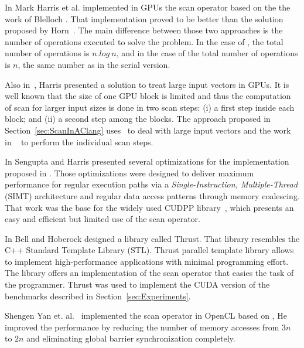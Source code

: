 \documentclass[Ingles]{ic-tese-v1}
\newcommand{\rsec}[1]{Section~\ref{sec:#1}}
\begin{document}
In \cite{harris2007parallel} Mark Harris  et al.  implemented in GPUs the scan
operator     based     on     the     the     work     of     Blelloch
\cite{ScanAsPrimitive}. That  implementation proved to be  better than
the solution  proposed by  Horn~\cite{GPUGems2}.  The  main difference
between those two  approaches is the number of  operations executed to
solve the problem. In the case of \cite{GPUGems2}, the total number of
operations is $n.log\ n$, and in the case of \cite{harris2007parallel}
the  total number  of operations  is $n$,  the same  number as  in the
serial version.  

Also  in~\cite{harris2007parallel},  Harris  presented a  solution  to
treat large input vectors in GPUs.  It  is well known that the size of
one GPU block  is limited and thus the computation  of scan for larger
input sizes is  done in two scan  steps: (i) a first  step inside each
block; and (ii) a second step among the blocks.  The approach proposed
in  \rsec{ScanInAClang}  uses~\cite{harris2007parallel} to  deal  with
large input vectors and the work in ~\cite{ScanAsPrimitive} to perform
the individual scan steps.

In   \cite{Sengupta:2008}  Sengupta   and  Harris   presented  several
optimizations     for      the     implementation      proposed     in
\cite{harris2007parallel}.   Those  optimizations   were  designed  to
deliver  maximum  performance  for   regular  execution  paths  via  a
\textit{Single-Instruction,  Multiple-Thread} (SIMT)  architecture and
regular data access patterns through memory coalescing.  That work was
the  base  for  the  widely  used  CUDPP  library~\cite{CUDPP},  which
presents an easy and efficient but limited use of the scan operator.

In  \cite{Nathan:2011} Bell  and  Hoberock designed  a library  called
Thrust.   That library  resembles  the C++  Standard Template  Library
(STL).   Thrust  parallel   template  library   allows  to   implement
high-performance  applications with  minimal  programming effort.  The
library offers an implementation of the scan operator that easies the task of 
the programmer.  Thrust  was used  to implement  the CUDA version of the  
benchmarks described in \rsec{Experiments}. 

Shengen Yan et.  al.~\cite{Yan:2013}  implemented the scan operator in
OpenCL based on \cite{harris2007parallel},  He improved the performance
by  reducing the  number  of memory  accesses from  $3n$  to $2n$  and
eliminating global barrier synchronization completely.
\end{document}
